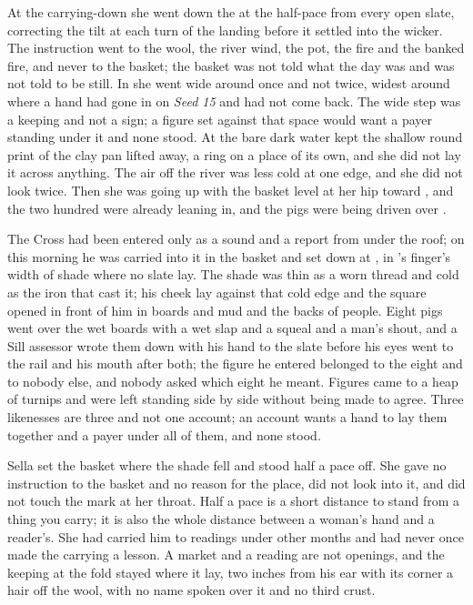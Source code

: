 At the carrying-down she went down the  at the half-pace from every open slate, correcting the tilt at each turn of the landing before it settled into the wicker. The instruction went to the wool, the river wind, the pot, the fire and the banked fire, and never to the basket; the basket was not told what the day was and was not told to be still. In  she went wide around  once and not twice, widest around  where a hand had gone in on \emph{Seed 15} and had not come back. The wide step was a keeping and not a sign; a figure set against that space would want a payer standing under it and none stood. At  the bare dark water kept the shallow round print of the clay pan lifted away, a ring on a place of its own, and she did not lay it across anything. The air off the river was less cold at one edge, and she did not look twice. Then she was going up  with the basket level at her hip toward , and the two hundred were already leaning in, and the pigs were being driven over .

\scenebreak

The Cross had been entered only as a sound and a report from under the roof; on this morning he was carried into it in the basket and set down at , in 's finger's width of shade where no slate lay. The shade was thin as a worn thread and cold as the iron that cast it; his cheek lay against that cold edge and the square opened in front of him in boards and mud and the backs of people. Eight pigs went over the wet boards with a wet slap and a squeal and a man's shout, and a Sill assessor wrote them down with his hand to the slate before his eyes went to the rail and his mouth after both; the figure he entered belonged to the eight and to nobody else, and nobody asked which eight he meant. Figures came to a heap of turnips and were left standing side by side without being made to agree. Three likenesses are three and not one account; an account wants a hand to lay them together and a payer under all of them, and none stood.

Sella set the basket where the shade fell and stood half a pace off. She gave no instruction to the basket and no reason for the place, did not look into it, and did not touch the mark at her throat. Half a pace is a short distance to stand from a thing you carry; it is also the whole distance between a woman's hand and a reader's. She had carried him to readings under other months and had never once made the carrying a lesson. A market and a reading are not openings, and the keeping at the fold stayed where it lay, two inches from his ear with its corner a hair off the wool, with no name spoken over it and no third crust.

